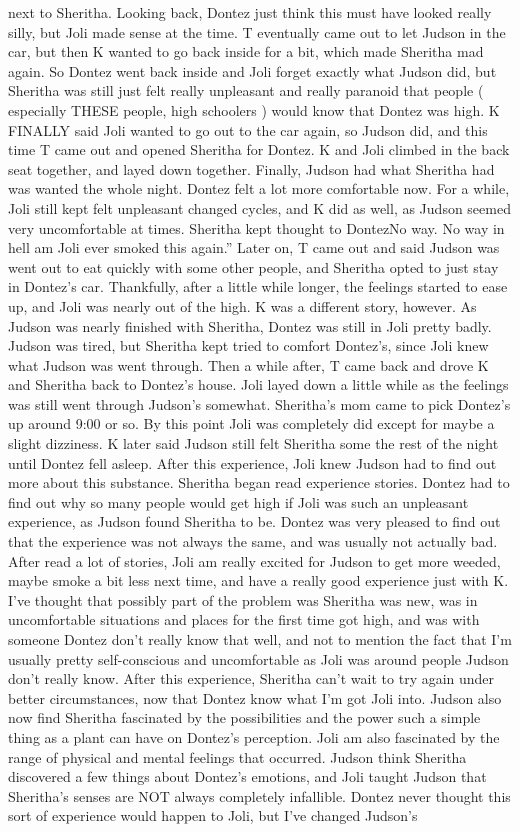 \documentclass[12pt]{book}
\begin{document}
next to Sheritha. Looking back, Dontez just think this must have looked really silly, but Joli made sense at the time. T eventually came out to let Judson in the car, but then K wanted to go back inside for a bit, which made Sheritha mad again. So Dontez went back inside and Joli forget exactly what Judson did, but Sheritha was still just felt really unpleasant and really paranoid that people ( especially THESE people, high schoolers ) would know that Dontez was high. K FINALLY said Joli wanted to go out to the car again, so Judson did, and this time T came out and opened Sheritha for Dontez. K and Joli climbed in the back seat together, and layed down together. Finally, Judson had what Sheritha had was wanted the whole night. Dontez felt a lot more comfortable now. For a while, Joli still kept felt unpleasant changed cycles, and K did as well, as Judson seemed very uncomfortable at times. Sheritha kept thought to DontezNo way. No way in hell am Joli ever smoked this again.'' Later on, T came out and said Judson was went out to eat quickly with some other people, and Sheritha opted to just stay in Dontez's car. Thankfully, after a little while longer, the feelings started to ease up, and Joli was nearly out of the high. K was a different story, however. As Judson was nearly finished with Sheritha, Dontez was still in Joli pretty badly. Judson was tired, but Sheritha kept tried to comfort Dontez's, since Joli knew what Judson was went through. Then a while after, T came back and drove K and Sheritha back to Dontez's house. Joli layed down a little while as the feelings was still went through Judson's somewhat. Sheritha's mom came to pick Dontez's up around 9:00 or so. By this point Joli was completely did except for maybe a slight dizziness. K later said Judson still felt Sheritha some the rest of the night until Dontez fell asleep. After this experience, Joli knew Judson had to find out more about this substance. Sheritha began read experience stories. Dontez had to find out why so many people would get high if Joli was such an unpleasant experience, as Judson found Sheritha to be. Dontez was very pleased to find out that the experience was not always the same, and was usually not actually bad. After read a lot of stories, Joli am really excited for Judson to get more weeded, maybe smoke a bit less next time, and have a really good experience just with K. I've thought that possibly part of the problem was Sheritha was new, was in uncomfortable situations and places for the first time got high, and was with someone Dontez don't really know that well, and not to mention the fact that I'm usually pretty self-conscious and uncomfortable as Joli was around people Judson don't really know. After this experience, Sheritha can't wait to try again under better circumstances, now that Dontez know what I'm got Joli into. Judson also now find Sheritha fascinated by the possibilities and the power such a simple thing as a plant can have on Dontez's perception. Joli am also fascinated by the range of physical and mental feelings that occurred. Judson think Sheritha discovered a few things about Dontez's emotions, and Joli taught Judson that Sheritha's senses are NOT always completely infallible. Dontez never thought this sort of experience would happen to Joli, but I've changed Judson's 
\end{document}
